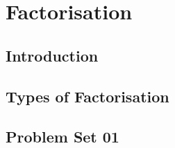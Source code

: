 \chapter{Factorisation}

\section{Introduction}

\section{Types of Factorisation}


\newpage
\section{Problem Set 01}
